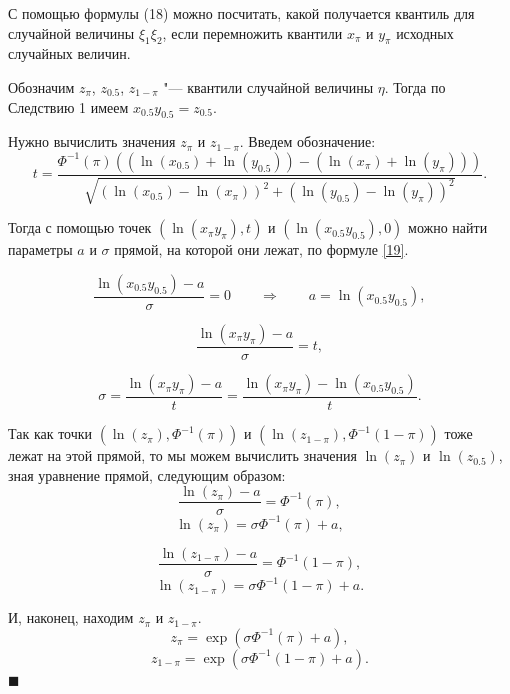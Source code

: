 \documentclass[12pt]{article}
\newenvironment{Proof}{\par\noindent{\bf Доказательство.}}{\hfill$\scriptstyle\blacksquare$}
\begin{document}
	\begin{Proof}
		С помощью формулы (18) можно посчитать, какой получается квантиль для случайной величины $\xi_{1}\xi_{2}$, если перемножить квантили $x_{\pi}$ и $y_{\pi}$ исходных случайных величин.
		
		Обозначим $z_{\pi}$, $z_{0.5}$, $z_{1-\pi}$ "--- квантили случайной величины $\eta$.
		Тогда по Следствию 1 имеем $x_{0.5}y_{0.5} = z_{0.5}$.
		
		Нужно вычислить значения $z_{\pi}$ и $z_{1-\pi}$. Введем обозначение:
		\begin{equation*}
			t = \frac{\Phi^{-1}(\pi)((\ln(x_{0.5})+\ln(y_{0.5}))-(\ln(x_{\pi})+\ln(y_{\pi})))}{\sqrt{(\ln(x_{0.5})-\ln(x_{\pi}))^{2}+(\ln(y_{0.5})-\ln(y_{\pi}))^{2}}}. 
		\end{equation*}
		
		Тогда с помощью точек $(\ln(x_{\pi}y_{\pi}), t)$ и $(\ln(x_{0.5}y_{0.5}),0)$  можно найти параметры $a$ и $\sigma$ прямой, на которой они лежат, по формуле \eqref{19}.
		
		\begin{equation*}
			\dfrac{\ln(x_{0.5}y_{0.5})-a}{\sigma}=0 \quad\quad \Rightarrow \quad\quad a=\ln(x_{0.5}y_{0.5}),
		\end{equation*}
		
		\begin{equation*}
			\dfrac{\ln(x_{\pi}y_{\pi})-a}{\sigma}=t,
		\end{equation*}
		
		\begin{equation*}
			\sigma=\dfrac{\ln(x_{\pi}y_{\pi})-a}{t}=\dfrac{\ln(x_{\pi}y_{\pi})-\ln(x_{0.5}y_{0.5})}{t}.
		\end{equation*}
		
		Так как точки $(\ln(z_{\pi}), \Phi^{-1}(\pi))$ и $(\ln(z_{1-\pi}), \Phi^{-1}(1-\pi))$ тоже лежат на этой прямой, то мы можем вычислить значения $\ln(z_{\pi})$ и $\ln(z_{0.5})$, зная уравнение прямой, следующим образом:
		\begin{equation*}
			\dfrac{\ln(z_{\pi})-a}{\sigma}=\Phi^{-1}(\pi),
		\end{equation*}
		\begin{equation*}
			\ln(z_{\pi})=\sigma\Phi^{-1}(\pi)+a,
		\end{equation*}
		
		\begin{equation*}
			\dfrac{\ln(z_{1-\pi})-a}{\sigma}=\Phi^{-1}(1-\pi),
		\end{equation*}
		\begin{equation*}
			\ln(z_{1-\pi})=\sigma\Phi^{-1}(1-\pi)+a.
		\end{equation*}
		
		И, наконец, находим $z_{\pi}$ и $z_{1-\pi}$.
		\begin{equation*}
			z_{\pi}=\exp(\sigma\Phi^{-1}(\pi)+a),
		\end{equation*}
		\begin{equation*}
			z_{1-\pi}=\exp(\sigma\Phi^{-1}(1-\pi)+a).
		\end{equation*}
	\end{Proof}
	
\end{document}

